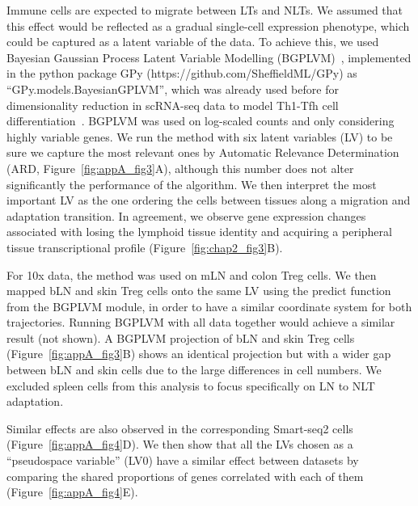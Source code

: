 Immune cells are expected to migrate between LTs and NLTs. We assumed that this effect would be reflected as a gradual single-cell expression phenotype, which could be captured as a latent variable of the data. To achieve this, we used Bayesian Gaussian Process Latent Variable Modelling (BGPLVM)~\citep{Michalis_K_Titsias2010-na}, implemented in the python package GPy (https://github.com/SheffieldML/GPy) as “GPy.models.BayesianGPLVM”, which was already used before for dimensionality reduction in scRNA-seq data to model Th1-Tfh cell differentiation~\citep{lonnberg_single-cell_2017}. BGPLVM was used on log-scaled counts and only considering highly variable genes. We run the method with six latent variables (LV) to be sure we capture the most relevant ones by Automatic Relevance Determination (ARD, Figure~\ref{fig:appA_fig3}A), although this number does not alter significantly the performance of the algorithm. We then interpret the most important LV as the one ordering the cells between tissues along a migration and adaptation transition. In agreement, we observe gene expression changes associated with losing the lymphoid tissue identity and acquiring a peripheral tissue transcriptional profile (Figure~\ref{fig:chap2_fig3}B).

For 10x data, the method was used on mLN and colon Treg cells. We then mapped bLN and skin Treg cells onto the same LV using the predict function from the BGPLVM module, in order to have a similar coordinate system for both trajectories. Running BGPLVM with all data together would achieve a similar result (not shown). A BGPLVM projection of bLN and skin Treg cells (Figure~\ref{fig:appA_fig3}B) shows an identical projection but with a wider gap between bLN and skin cells due to the large differences in cell numbers. We excluded spleen cells from this analysis to focus specifically on LN to NLT adaptation.

Similar effects are also observed in the corresponding Smart-seq2 cells (Figure~\ref{fig:appA_fig4}D). We then show that all the LVs chosen as a “pseudospace variable” (LV0) have a similar effect between datasets by comparing the shared proportions of genes correlated with each of them (Figure~\ref{fig:appA_fig4}E). 

